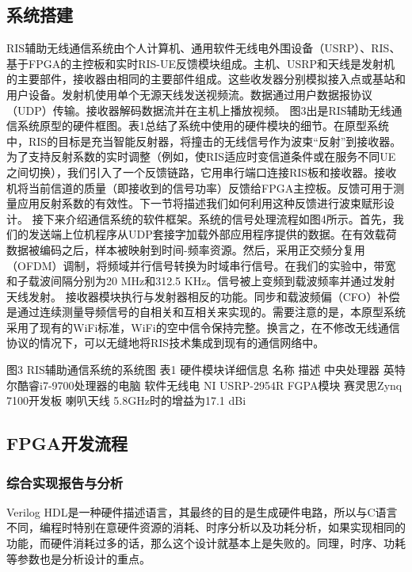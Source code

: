 \documentclass[supercite]{HustGraduPaper}
\begin{document}
\subsection{系统搭建}
RIS辅助无线通信系统由个人计算机、通用软件无线电外围设备（USRP）、RIS、基于FPGA的主控板和实时RIS-UE反馈模块组成。主机、USRP和天线是发射机的主要部件，接收器由相同的主要部件组成。这些收发器分别模拟接入点或基站和用户设备。发射机使用单个无源天线发送视频流。数据通过用户数据报协议（UDP）传输。接收器解码数据流并在主机上播放视频。
图3出是RIS辅助无线通信系统原型的硬件框图。表1总结了系统中使用的硬件模块的细节。在原型系统中，RIS的目标是充当智能反射器，将撞击的无线信号作为波束“反射”到接收器。为了支持反射系数的实时调整（例如，使RIS适应时变信道条件或在服务不同UE之间切换），我们引入了一个反馈链路，它用串行端口连接RIS板和接收器。接收机将当前信道的质量（即接收到的信号功率）反馈给FPGA主控板。反馈可用于测量应用反射系数的有效性。下一节将描述我们如何利用这种反馈进行波束赋形设计。
接下来介绍通信系统的软件框架。系统的信号处理流程如图4所示。首先，我们的发送端上位机程序从UDP套接字加载外部应用程序提供的数据。在有效载荷数据被编码之后，样本被映射到时间-频率资源。然后，采用正交频分复用（OFDM）调制，将频域并行信号转换为时域串行信号。在我们的实验中，带宽和子载波间隔分别为20 MHz和312.5 KHz。信号被上变频到载波频率并通过发射天线发射。
接收器模块执行与发射器相反的功能。同步和载波频偏（CFO）补偿是通过连续测量导频信号的自相关和互相关来实现的。需要注意的是，本原型系统采用了现有的WiFi标准，WiFi的空中信令保持完整。换言之，在不修改无线通信协议的情况下，可以无缝地将RIS技术集成到现有的通信网络中。
 
图3 RIS辅助通信系统的系统图
表1 硬件模块详细信息
名称	描述
中央处理器	英特尔酷睿i7-9700处理器的电脑
软件无线电	NI USRP-2954R
FGPA模块	赛灵思Zynq 7100开发板
喇叭天线	5.8GHz时的增益为17.1 dBi

\subsection{FPGA开发流程}

\subsubsection{综合实现报告与分析}

Verilog HDL是一种硬件描述语言，其最终的目的是生成硬件电路，所以与C语言不同，编程时特别在意硬件资源的消耗、时序分析以及功耗分析，如果实现相同的功能，而硬件消耗过多的话，那么这个设计就基本上是失败的。同理，时序、功耗等参数也是分析设计的重点。

\end{document}
